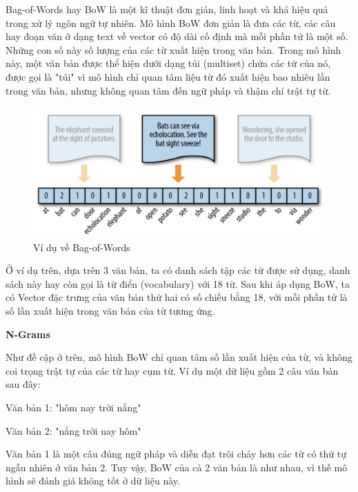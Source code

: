 \documentclass[12pt,a4paper,oneside]{book}
\begin{document}
	Bag-of-Words hay BoW là một kĩ thuật đơn giản, linh hoạt và khá hiệu quả trong xử lý ngôn ngữ tự nhiên. Mô hình BoW đơn giản là đưa các từ, các câu hay đoạn văn ở dạng text về vector có độ dài cố định mà mỗi phần tử là một số. Những con số này số lượng của các từ xuất hiện trong văn bản. Trong mô hình này, một văn bản được thể hiện dưới dạng túi (multiset) chứa các từ của nó, được gọi là "túi" vì mô hình chỉ quan tâm liệu từ đó xuất hiện bao nhiêu lần trong văn bản, nhưng không quan tâm đến ngữ pháp và thậm chí trật tự từ.
	
	\begin{figure}[H]
		\begin{center}
			\includegraphics[width=0.8\columnwidth]{bow.png}
		\end{center}
		\caption{Ví dụ về Bag-of-Words}
	\end{figure}
	Ở ví dụ trên, dựa trên 3 văn bản, ta có danh sách tập các từ được sử dụng, danh sách này hay còn gọi là từ điển (vocabulary) với 18 từ. Sau khi áp dụng BoW, ta có Vector đặc trưng của văn bản thứ hai có số chiều bằng 18, với mỗi phần tử là số lần xuất hiện trong văn bản của từ tương ứng.
	
	\textbf{N-Grams}
	
	Như đề cập ở trên, mô hình BoW chỉ quan tâm số lần xuất hiện của từ, và không coi trọng trật tự của các từ hay cụm từ. Ví dụ một dữ liệu gồm 2 câu văn bản sau đây:
	
	\hspace{1cm} Văn bản 1: "hôm nay trời nắng"
	
	\hspace{1cm} Văn bản 2: "nắng trời nay hôm"
	
	Văn bản 1 là một câu đúng ngữ pháp và diễn đạt trôi chảy hơn các từ có thứ tự ngẫu nhiên ở văn bản 2. Tuy vậy, BoW của cả 2 văn bản là như nhau, vì thế mô hình sẽ đánh giá không tốt ở dữ liệu này.
	
\end{document}
